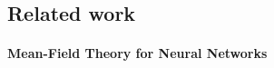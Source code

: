\documentclass[nohyperref]{article}
\theoremstyle{plain}
\theoremstyle{definition}
\theoremstyle{remark}
\begin{document}



\subsection{Related work}

\paragraph{Mean-Field Theory for Neural Networks}
\label{sec:related}
\end{document}
